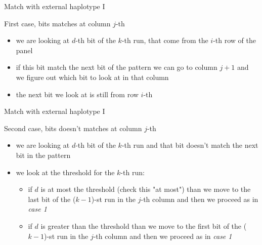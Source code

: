 \documentclass{beamer}
\begin{document}
\begin{frame}{Match with external haplotype I}
  \begin{block}{First case, bits matches at column $j$-th}
    \begin{itemize}
        \item we are looking at $d$-th bit of the $k$-th run, that come from the
        $i$-th row of the panel 
        \item if this bit match the next bit of the pattern we can go to column
        $j+1$ and we figure out which bit to look at in that column 
        \item the next bit we look at is still from row $i$-th
    \end{itemize}
  \end{block}
\end{frame}
\begin{frame}{Match with external haplotype I}
  \begin{block}{Second case, bits doesn't matches at column $j$-th}
    \begin{itemize}
        \item we are looking at $d$-th bit of the $k$-th run and that bit
        doesn't match the next bit in the pattern 
        \item we look at the threshold for the $k$-th run:
        \begin{itemize}
            \item if $d$ is at most the threshold (check this "at most") than we
            move to the last bit of the ($k-1$)-st run in the $j$-th column and
            then we proceed as in \textit{case 1}  
            \item if $d$ is greater than the threshold than we move to the first
            bit of the ($k-1$)-st run in the $j$-th column and then we proceed
            as in \textit{case 1}  
        \end{itemize}
    \end{itemize}
  \end{block}
\end{frame}
%   
%   
\end{document}
